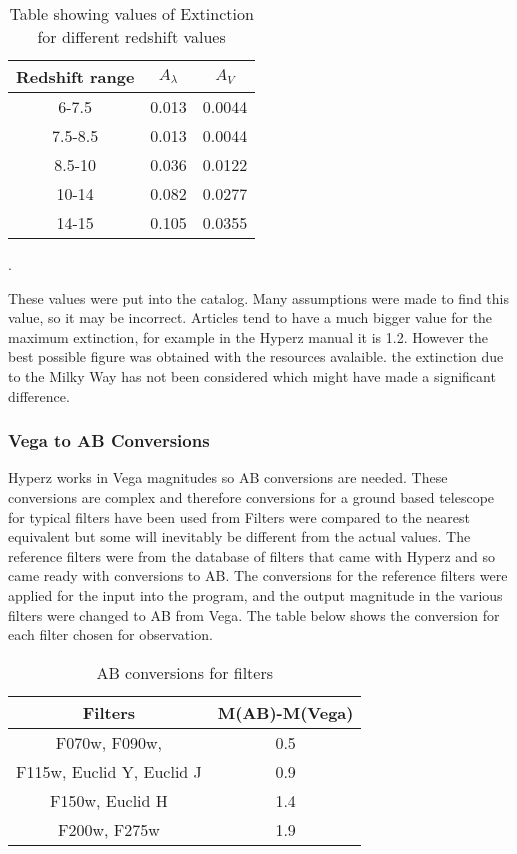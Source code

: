 			\begin{table}[ht]
				\begin{center}
					\begin{tabular}{c|c|c}
						Redshift range & $A_\lambda$ & $A_V$  \\
						\hline \hline
						6-7.5	   &0.013&  0.0044 \\
						7.5-8.5&0.013&  0.0044 \\
						8.5-10 &0.036&  0.0122\\
						10-14  &0.082&  0.0277\\
						14-15  &0.105&  0.0355\\
					\end{tabular}
				\end{center}
				\caption{Table showing values of Extinction for different redshift values}
				\label{tab:extinction_values}
			\end{table}.

These values were put into the catalog. Many assumptions were made to find this value, so it may be incorrect. Articles tend to have a much bigger value for the maximum extinction, for example in the Hyperz manual it is 1.2. However the best possible figure was obtained with the resources avalaible. the extinction due to the Milky Way has not been considered which might have made a significant difference.

	          \subsubsection{Vega to AB Conversions}
		Hyperz works in Vega magnitudes so AB conversions are needed. These conversions are complex and therefore conversions for a ground based telescope for typical filters have been used from \cite[576]{Graham} Filters were compared to the nearest equivalent but some will inevitably be different from the actual values. The reference filters were from the database of filters that came with Hyperz and so came ready with conversions to AB. The conversions for the reference filters were applied for the input into the program, and the output magnitude in the various filters were changed to AB from Vega. The table below shows the conversion for each filter chosen for observation.
			\begin{table}[ht]
				\begin{center}
					\begin{tabular}{c|c}
						Filters & M(AB)-M(Vega) \\
						\hline \hline
						F070w, F090w,  & 0.5 \\
						F115w, Euclid Y, Euclid J	& 0.9\\
						 F150w, Euclid H	& 1.4\\
						F200w, F275w & 1.9\\
					\end{tabular}
				\end{center}
				\caption{AB conversions for filters}
				\label{tab:AB_conversion}
			\end{table}


